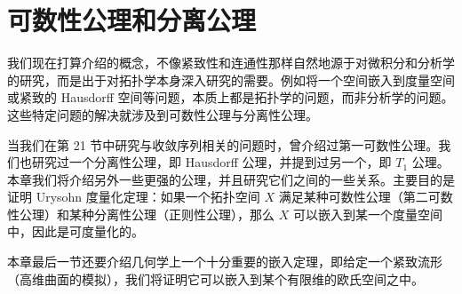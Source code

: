 \documentclass[../main.tex]{subfiles}
\begin{document}
\chapter{可数性公理和分离公理}\label{chapter:ch04-可数性公理和分离公理}

我们现在打算介绍的概念，不像紧致性和连通性那样自然地源于对微积分和分析学的研究，而是出于对拓扑学本身深入研究的需要。例如将一个空间嵌入到度量空间或紧致的 Hausdorff 空间等问题，本质上都是拓扑学的问题，而非分析学的问题。这些特定问题的解决就涉及到可数性公理与分离性公理。

当我们在第 21 节中研究与收敛序列相关的问题时，曾介绍过第一可数性公理。我们也研究过一个分离性公理，即 Hausdorff 公理，并提到过另一个，即 $T_{1}$ 公理。本章我们将介绍另外一些更强的公理，并且研究它们之间的一些关系。主要目的是证明 Urysohn 度量化定理：如果一个拓扑空间 $X$ 满足某种可数性公理（第二可数性公理）和某种分离性公理（正则性公理），那么 $X$ 可以嵌入到某一个度量空间中，因此是可度量化的。

本章最后一节还要介绍几何学上一个十分重要的嵌入定理，即给定一个紧致流形（高维曲面的模拟），我们将证明它可以嵌入到某个有限维的欧氏空间之中。









\end{document}
